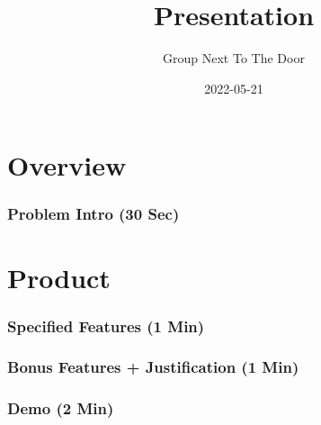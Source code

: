 \documentclass[12pt]{beamer}
\title{Presentation}
\author{Group Next To The Door}
\date{2022-05-21}
\begin{document}
\begin{frame}
  \maketitle
\end{frame}


\section{Overview}
\begin{frame}[plain]
  \frametitle{Problem Intro (30 Sec)}
\end{frame}

\section{Product}
\begin{frame}[plain]
  \frametitle{Specified Features (1 Min)}
\end{frame}

\begin{frame}[plain]
  \frametitle{Bonus Features + Justification (1 Min)}
\end{frame}

\begin{frame}[plain]
  \frametitle{Demo (2 Min)}
\end{frame}
\end{document}
